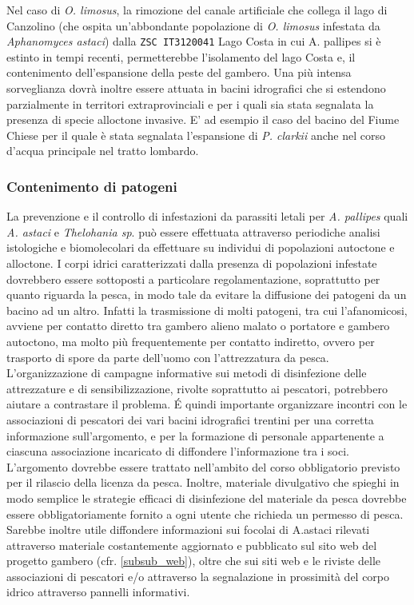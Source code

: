 \documentclass[11pt,a4paper,italian,twoside,openany]{memoir}
\begin{document}
Nel caso di \emph{O. limosus}, la rimozione del canale artificiale che collega il lago di Canzolino (che ospita un'abbondante popolazione di \emph{O. limosus} infestata da \emph{Aphanomyces astaci}) dalla \texttt{ZSC IT3120041} Lago Costa in cui A. pallipes si è estinto in tempi recenti, permetterebbe l'isolamento del lago Costa e, il contenimento dell'espansione della peste del gambero. Una più intensa sorveglianza dovrà inoltre essere attuata in bacini idrografici che si estendono parzialmente in territori extraprovinciali e per i quali sia stata segnalata la presenza di specie alloctone invasive. E' ad esempio il caso del bacino del Fiume Chiese per il quale è stata segnalata l'espansione di \emph{P. clarkii} anche nel corso d'acqua principale nel tratto lombardo. 

\subsubsection{Contenimento di patogeni} 
La prevenzione e il controllo di infestazioni da parassiti letali per \emph{A. pallipes} quali \emph{A. astaci} e \emph{Thelohania sp}. può essere effettuata attraverso periodiche analisi istologiche e biomolecolari da effettuare su individui di popolazioni autoctone e alloctone. I corpi idrici caratterizzati dalla presenza di popolazioni infestate dovrebbero essere sottoposti a particolare regolamentazione, soprattutto per quanto riguarda la pesca, in modo tale da evitare la diffusione dei patogeni da un bacino ad un altro. Infatti la trasmissione di molti patogeni, tra cui l'afanomicosi, avviene per contatto diretto tra gambero alieno malato o portatore e gambero autoctono, ma molto più frequentemente per contatto indiretto, ovvero per trasporto di spore da parte dell'uomo con l'attrezzatura da pesca. L'organizzazione di campagne informative sui metodi di disinfezione delle attrezzature e di sensibilizzazione, rivolte soprattutto ai pescatori, potrebbero aiutare a contrastare il problema. É quindi importante organizzare incontri con le associazioni di pescatori dei vari bacini idrografici trentini per una corretta informazione sull'argomento, e per la formazione di personale appartenente a ciascuna associazione incaricato di diffondere l'informazione tra i soci. L'argomento dovrebbe essere trattato nell'ambito del corso obbligatorio previsto per il rilascio della licenza da pesca. Inoltre, materiale divulgativo che spieghi in modo semplice le strategie efficaci di disinfezione del materiale da pesca dovrebbe essere obbligatoriamente fornito a ogni utente che richieda un permesso di pesca. Sarebbe inoltre utile diffondere informazioni sui focolai di A.astaci rilevati attraverso materiale costantemente aggiornato e pubblicato sul sito web del progetto gambero (cfr. \ref{subsub_web}), oltre che sui siti web e le riviste delle associazioni di pescatori e/o attraverso la segnalazione in prossimità del corpo idrico attraverso pannelli informativi.
\end{document}
